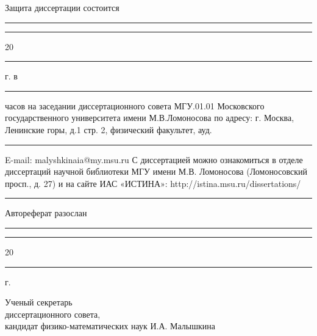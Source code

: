\vfill


Защита диссертации состоится  \guillemotleft\rule{3mm}{0.15mm}\guillemotright \rule{15mm}{0.15mm} 20\rule{3mm}{0.15mm} г. в \rule{5mm}{0.15mm} часов на заседании диссертационного совета МГУ.01.01 Московского государственного университета имени М.В.Ломоносова по адресу: г. Москва, Ленинские горы, д.1 стр. 2, физический факультет, ауд.\rule{5mm}{0.15mm}
\bigbreak
E-mail: malyshkinaia@my.msu.ru
\bigbreak
С диссертацией можно ознакомиться в отделе диссертаций научной библиотеки МГУ имени М.В. Ломоносова (Ломоносовский просп., д. 27) и на сайте ИАС «ИСТИНА»: http://istina.msu.ru/dissertations/\rule{20mm}{0.15mm}
Автореферат разослан 
\guillemotleft\rule{3mm}{0.15mm}\guillemotright \rule{15mm}{0.15mm} 20\rule{3mm}{0.15mm} г.

\bigbreak

{\parindent0pt Ученый секретарь \\
диссертационного совета, \\
кандидат физико-математических наук \hfill	И.А. Малышкина}

\thispagestyle{empty}
\newpage